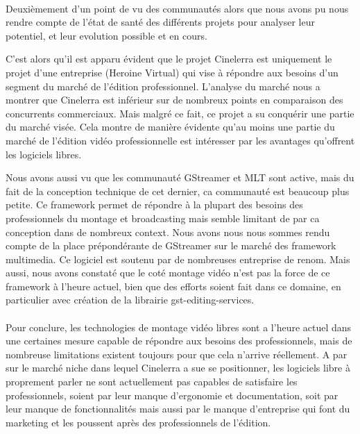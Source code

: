 \paragraph{}

Deuxièmement d'un point de vu des communautés alors que nous avons
pu nous rendre compte de l'état de santé des différents projets pour
analyser leur potentiel, et leur evolution possible et en cours.

C'est alors qu'il est apparu évident que le projet Cinelerra est
uniquement le projet d'une entreprise (Heroine Virtual) qui vise
à répondre aux besoins d'un segment du marché de l'édition
professionnel. L'analyse du marché nous a montrer que Cinelerra
est inférieur sur de nombreux points en comparaison des concurrents
commerciaux.  Mais malgré ce fait, ce projet a su conquérir une partie
du marché visée. Cela montre de manière évidente qu'au moins une
partie du marché de l'édition vidéo professionnelle est intéresser
par les avantages qu'offrent les logiciels libres.

Nous avons aussi vu que les communauté GStreamer et MLT sont active,
mais du fait de la conception technique de cet dernier, ca communauté
est beaucoup plus petite. Ce framework permet de répondre à la plupart
des besoins des professionnels du montage et broadcasting mais semble
limitant de par ca conception dans de nombreux context.  Nous avons
nous nous sommes rendu compte de la place prépondérante de GStreamer
sur le marché des framework multimedia. Ce logiciel est soutenu par de
nombreuses entreprise de renom. Mais aussi, nous avons constaté que
le coté montage vidéo n'est pas la force de ce framework à l'heure
actuel, bien que des efforts soient fait dans ce domaine, en particulier
avec création de la librairie gst-editing-services.

\paragraph{}

Pour conclure, les technologies de montage vidéo libres sont a l'heure
actuel dans une certaines mesure capable de répondre aux besoins des
professionnels, mais de nombreuse limitations existent toujours pour
que cela n'arrive réellement.  A par sur le marché niche dans lequel
Cinelerra a sue se positionner, les logiciels libre à proprement parler
ne sont actuellement pas capables de satisfaire les professionnels, soient
par leur manque d'ergonomie et documentation, soit par leur manque de
fonctionnalités mais aussi par le manque d'entreprise qui font du marketing
et les poussent après des professionnels de l'édition.
